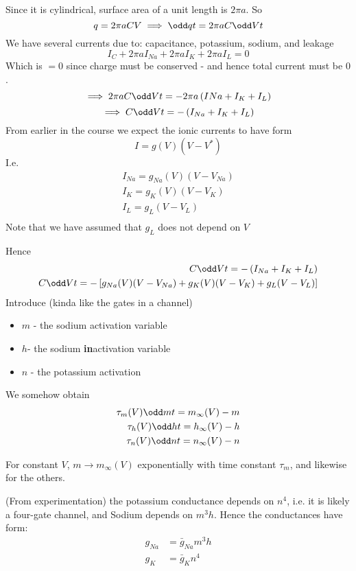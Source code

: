\documentclass{X:/Documents/Coding/Latex/myassignment}
\begin{document}
Since it is cylindrical, surface area of a unit length is $2\pi a$.
So
\[q = 2\pi a C V \implies \odd qt = 2\pi a C \odd Vt\]
We have several currents due to: capacitance, potassium, sodium, and leakage
\[I_C + 2\pi a I_{Na} + 2\pi a I_{K} + 2\pi a I_{L} = 0\]
Which is $=0$ since charge must be conserved - and hence total current must be $0$.
\[\implies 2\pi aC \odd Vt = -2\pi a\left(I{Na} + I_{K} + I_{L}\right)\]
\[\implies C \odd Vt = -\left(I_{Na} + I_K + I_L\right)\]
From earlier in the course we expect the ionic currents to have form
\[I = g(V) (V-V^*)\]
I.e.
\begin{align*}
	I_{Na} = g_{Na}(V) (V-V_{Na})\\
	I_{K} = g_{K}(V) (V-V_{K})\\
	I_{L} = g_{L}(V-V_{L})\\
\end{align*}
Note that we have assumed that $g_{L}$ does not depend on $V$

Hence
\begin{align*}
	C \odd Vt = -\left(I_{Na} + I_K + I_L\right)\\
	C \odd Vt = -\left[g_{Na}(V) (V-V_{Na}) +  g_{K}(V) (V-V_{K}) +  g_{L}(V-V_{L})\right]
\end{align*}
Introduce (kinda like the gates in a channel)
\begin{itemize}
	\item $m$ - the sodium activation variable
	\item $h$- the sodium \textbf{in}activation variable
	\item $n$ - the potassium activation
\end{itemize}
We somehow obtain
\begin{align*}
	\tau_m(V) \odd mt = m_\infty (V) - m\\
	\tau_h(V) \odd ht = h_\infty (V) - h\\
	\tau_n(V) \odd nt = n_\infty (V) - n\\
\end{align*}

For constant $V$, $m \to m_{\infty}(V)$ exponentially with time constant $\tau_m$, and likewise for the others.

(From experimentation) the potassium conductance depends on $n^4$, i.e. it is likely a four-gate channel, and Sodium depends on $m^3 h$.
Hence the conductances have form:
\begin{align*}
	g_{Na} &= \bar{g}_{Na} m^3 h\\
	g_{K} &= \bar{g}_{K} n^4
\end{align*}
\end{document}
